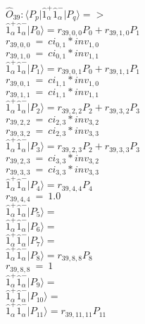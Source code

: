 \documentclass[14pt]{article}
\begin{document}
    $\hat{O}_{39}:  \langle{P_p}\vert \hat{1}_{\alpha}^{+}\hat{1}_{\alpha}^{-} \vert{P_q}\rangle => $ \\ 
    $ \hat{1}_{\alpha}^{+}\hat{1}_{\alpha}^{-} \vert{P_{0}}\rangle = {r}_{39,0,0}P_{0}+{r}_{39,1,0}P_{1} $ \\ 
    ${r}_{39,0,0}\ =\ {ci}_{0,1}*{inv}_{1,0} $ \\ 
    ${r}_{39,1,0}\ =\ {ci}_{0,1}*{inv}_{1,1} $ \\ 
    $ \hat{1}_{\alpha}^{+}\hat{1}_{\alpha}^{-} \vert{P_{1}}\rangle = {r}_{39,0,1}P_{0}+{r}_{39,1,1}P_{1} $ \\ 
    ${r}_{39,0,1}\ =\ {ci}_{1,1}*{inv}_{1,0} $ \\ 
    ${r}_{39,1,1}\ =\ {ci}_{1,1}*{inv}_{1,1} $ \\ 
    $ \hat{1}_{\alpha}^{+}\hat{1}_{\alpha}^{-} \vert{P_{2}}\rangle = {r}_{39,2,2}P_{2}+{r}_{39,3,2}P_{3} $ \\ 
    ${r}_{39,2,2}\ =\ {ci}_{2,3}*{inv}_{3,2} $ \\ 
    ${r}_{39,3,2}\ =\ {ci}_{2,3}*{inv}_{3,3} $ \\ 
    $ \hat{1}_{\alpha}^{+}\hat{1}_{\alpha}^{-} \vert{P_{3}}\rangle = {r}_{39,2,3}P_{2}+{r}_{39,3,3}P_{3} $ \\ 
    ${r}_{39,2,3}\ =\ {ci}_{3,3}*{inv}_{3,2} $ \\ 
    ${r}_{39,3,3}\ =\ {ci}_{3,3}*{inv}_{3,3} $ \\ 
    $ \hat{1}_{\alpha}^{+}\hat{1}_{\alpha}^{-} \vert{P_{4}}\rangle = {r}_{39,4,4}P_{4} $ \\ 
    ${r}_{39,4,4}\ =\ 1.0 $ \\ 
    $ \hat{1}_{\alpha}^{+}\hat{1}_{\alpha}^{-} \vert{P_{5}}\rangle =  $ \\ 
    $ \hat{1}_{\alpha}^{+}\hat{1}_{\alpha}^{-} \vert{P_{6}}\rangle =  $ \\ 
    $ \hat{1}_{\alpha}^{+}\hat{1}_{\alpha}^{-} \vert{P_{7}}\rangle =  $ \\ 
    $ \hat{1}_{\alpha}^{+}\hat{1}_{\alpha}^{-} \vert{P_{8}}\rangle = {r}_{39,8,8}P_{8} $ \\ 
    ${r}_{39,8,8}\ =\ 1 $ \\ 
    $ \hat{1}_{\alpha}^{+}\hat{1}_{\alpha}^{-} \vert{P_{9}}\rangle =  $ \\ 
    $ \hat{1}_{\alpha}^{+}\hat{1}_{\alpha}^{-} \vert{P_{10}}\rangle =  $ \\ 
    $ \hat{1}_{\alpha}^{+}\hat{1}_{\alpha}^{-} \vert{P_{11}}\rangle = {r}_{39,11,11}P_{11} $ \\ 
\end{document}
